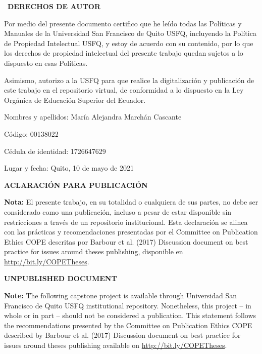 \documentclass[../main.tex]{subfiles}
\begin{document}
\justify
\begin{center}
{\Large \textcopyright \ \textbf{DERECHOS DE AUTOR}}
\end{center}
Por medio del presente documento certifico que he leído todas las Políticas y Manuales de la Universidad San Francisco de Quito USFQ, incluyendo la Política de Propiedad Intelectual USFQ, y estoy de acuerdo con su contenido, por lo que los derechos de propiedad intelectual del presente trabajo quedan sujetos a lo dispuesto en esas Políticas.

Asimismo, autorizo a la USFQ para que realice la digitalización y publicación de este trabajo en el repositorio virtual, de conformidad a lo dispuesto en la Ley Orgánica de Educación Superior del Ecuador.

\vspace{4cm}

\noindent Nombres y apellidos: \hspace{1.8cm} María Alejandra Marchán Cascante

\vspace{1cm}
\noindent Código: \hspace{4cm} 00138022

\vspace{1cm}
\noindent Cédula de identidad: \hspace{1.9cm} 1726647629

\vspace{1cm}
\noindent Lugar y fecha: \hspace{3cm} Quito, 10 de mayo de 2021
\clearpage
\begin{center}
{\Large \textbf{ACLARACIÓN PARA PUBLICACIÓN}}
\end{center}
\justify %
\noindent \textbf{Nota:} El presente trabajo, en su totalidad o cualquiera de sus partes, no debe ser considerado como una publicación, incluso a pesar de estar disponible sin restricciones a través de un repositorio institucional. Esta declaración se alinea con las prácticas y recomendaciones presentadas por el Committee on Publication Ethics COPE descritas por Barbour et al. (2017) Discussion document on best practice for issues around theses publishing, disponible en \href{http://bit.ly/COPETheses}{http://bit.ly/COPETheses}.
\begin{center}
{\Large \textbf{UNPUBLISHED DOCUMENT}}
\end{center}
\noindent \textbf{Note:} The following capstone project is available through Universidad San Francisco de Quito USFQ institutional repository. Nonetheless, this project – in whole or in part – should not be considered a publication. This statement follows the recommendations presented by the Committee on Publication Ethics COPE described by Barbour et al. (2017) Discussion document on best practice for issues around theses publishing available on \href{http://bit.ly/COPETheses}{http://bit.ly/COPETheses}.
\end{document}
